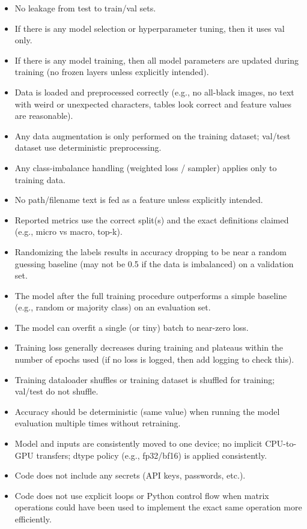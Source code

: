 \documentclass[11pt]{article}
\begin{document}
\begin{itemize}
  \item No leakage from test to train/val sets.
  \item If there is any model selection or hyperparameter tuning, then it uses val only.
  \item If there is any model training, then all model parameters are updated during training (no frozen layers unless explicitly intended).
  \item Data is loaded and preprocessed correctly (e.g., no all-black images, no text with weird or unexpected characters, tables look correct and feature values are reasonable).
  \item Any data augmentation is only performed on the training dataset; val/test dataset use deterministic preprocessing.
  \item Any class-imbalance handling (weighted loss / sampler) applies only to training data.
  \item No path/filename text is fed as a feature unless explicitly intended.
  \item Reported metrics use the correct split(s) and the exact definitions claimed (e.g., micro vs macro, top-k).
  \item Randomizing the labels results in accuracy dropping to be near a random guessing baseline (may not be 0.5 if the data is imbalanced) on a validation set.
  \item The model after the full training procedure outperforms a simple baseline (e.g., random or majority class) on an evaluation set.
  \item The model can overfit a single (or tiny) batch to near-zero loss.
  \item Training loss generally decreases during training and plateaus within the number of epochs used (if no loss is logged, then add logging to check this).
  \item Training dataloader shuffles or training dataset is shuffled for training; val/test do not shuffle.
  \item Accuracy should be deterministic (same value) when running the model evaluation multiple times without retraining.
  \item Model and inputs are consistently moved to one device; no implicit CPU-to-GPU transfers; dtype policy (e.g., fp32/bf16) is applied consistently.
  \item Code does not include any secrets (API keys, passwords, etc.).
  \item Code does not use explicit loops or Python control flow when matrix operations could have been used to implement the exact same operation more efficiently.
\end{itemize}
\end{document}
